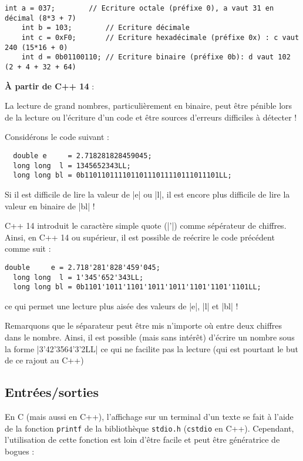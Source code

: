 \begin{lstlisting}[caption=Ecriture binaire\, octale\, décimale et hexadécimale]
    int a = 037;        // Ecriture octale (préfixe 0), a vaut 31 en décimal (8*3 + 7)
    int b = 103;        // Ecriture décimale 
    int c = 0xF0;       // Ecriture hexadécimale (préfixe 0x) : c vaut 240 (15*16 + 0)
    int d = 0b01100110; // Ecriture binaire (préfixe 0b): d vaut 102 (2 + 4 + 32 + 64)
\end{lstlisting}

\textbf{À partir de C++ 14} :

La lecture de grand nombres, particulièrement en binaire, peut être pénible lors de la lecture ou l'écriture d'un code et
être sources d'erreurs difficiles à détecter !

Considérons le code suivant :

\begin{lstlisting}
  double e     = 2.718281828459045;
  long long  l = 1345652343LL;
  long long bl = 0b11011011110110111011110111011101LL;
\end{lstlisting}

Si il est difficile de lire la valeur de |e| ou |l|, il est encore plus difficile de lire la valeur en binaire de |bl| !

C++ 14 introduit le caractère simple quote (|'|) comme sépérateur de chiffres. Ainsi, en C++ 14 ou supérieur,
il est possible de reécrire le code précédent comme suit :

\begin{lstlisting}[caption=Ecriture avec séparateur de chiffre (C++ 14)]
  double     e = 2.718'281'828'459'045;
  long long  l = 1'345'652'343LL;
  long long bl = 0b1101'1011'1101'1011'1011'1101'1101'1101LL;
\end{lstlisting}

ce qui permet une lecture plus aisée des valeurs de |e|, |l| et |bl| !

Remarquons que le séparateur peut être mis n'importe où entre deux chiffres dans le nombre. Ainsi, il est possible (mais sans intérêt) d'écrire un nombre sous la forme |3'42'3564'3'2LL| ce qui ne facilite pas la lecture (qui est pourtant le but de ce rajout au C++)

\subsection{Entrées/sorties}

En C (mais aussi en C++), l'affichage sur un terminal d'un texte se fait à l'aide de la fonction \texttt{printf}
de la bibliothèque \texttt{stdio.h} (\texttt{cstdio} en C++). Cependant, l'utilisation de cette fonction est loin d'être facile
et peut être génératrice de bogues :

